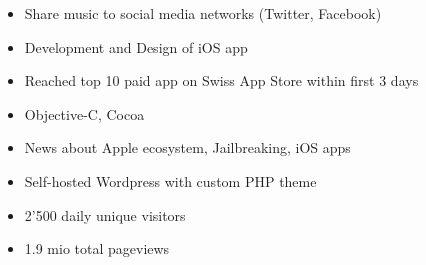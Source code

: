 \begin{itemize}
	\item Share music to social media networks (Twitter, Facebook)
	\item Development and Design of iOS app
	\item Reached top 10 paid app on Swiss App Store within first 3 days
	\item Objective-C, Cocoa
\end{itemize}

\divider

\begin{itemize}
	\item News about Apple ecosystem, Jailbreaking, iOS apps
	\item Self-hosted Wordpress with custom PHP theme
	\item 2'500 daily unique visitors
	\item 1.9 mio total pageviews
\end{itemize}